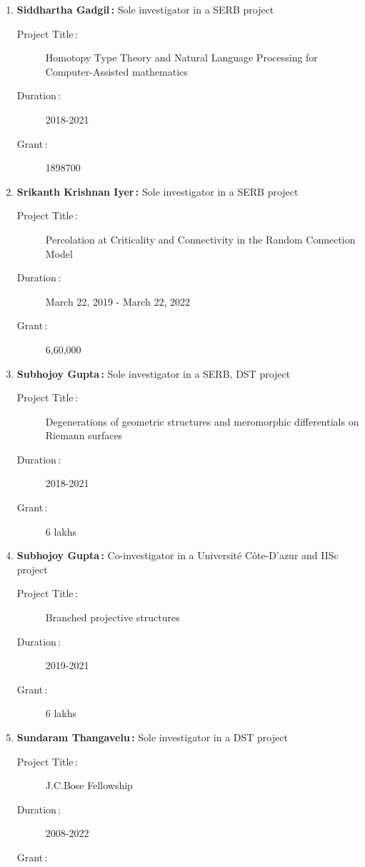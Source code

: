 \begin{enumerate}
\item {\bf Siddhartha Gadgil\,:} Sole investigator in a SERB project
\begin{description}
  \item[Project Title\,:] Homotopy Type Theory and Natural Language Processing for Computer-Assisted mathematics
  \item[Duration\,:] 2018-2021
  \item[Grant\,:] 1898700
\end{description}


\item {\bf Srikanth Krishnan Iyer\,:} Sole investigator in a SERB project
\begin{description}
  \item[Project Title\,:] Percolation at Criticality and Connectivity in the Random Connection Model
  \item[Duration\,:] March 22, 2019 - March 22, 2022
  \item[Grant\,:] 6,60,000
\end{description}


\item {\bf Subhojoy Gupta\,:} Sole investigator in a SERB, DST project
\begin{description}
  \item[Project Title\,:] Degenerations of geometric structures and meromorphic differentials on Riemann surfaces
  \item[Duration\,:] 2018-2021
  \item[Grant\,:] 6 lakhs
\end{description}


\item {\bf Subhojoy Gupta\,:} Co-investigator in a Université Côte-D'azur and IISc project
\begin{description}
  \item[Project Title\,:] Branched projective structures
  \item[Duration\,:] 2019-2021
  \item[Grant\,:] 6 lakhs
\end{description}


\item {\bf Sundaram Thangavelu\,:} Sole investigator in a DST project
\begin{description}
  \item[Project Title\,:] J.C.Bose Fellowship
  \item[Duration\,:] 2008-2022
  \item[Grant\,:] 
\end{description}



\end{enumerate}
